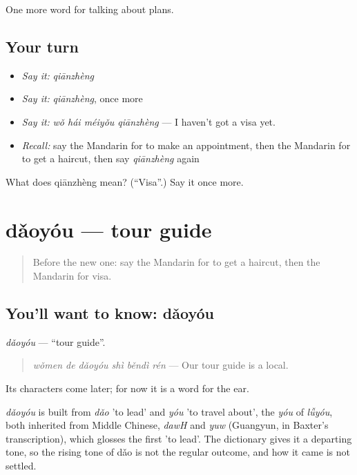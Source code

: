 \begin{grammarlens}[title={What you've built}]
One more word for talking about plans.
\end{grammarlens}

\subsection*{Your turn}
\begin{itemize}
\raggedright
  \item \emph{Say it:} \emph{qiānzhèng}
  \item \emph{Say it:} \emph{qiānzhèng}, once more
  \item \emph{Say it:} \emph{wǒ hái méiyǒu qiānzhèng} — I haven't got a visa yet.
  \item \emph{Recall:} say the Mandarin for to make an appointment, then the Mandarin for to get a haircut, then say \emph{qiānzhèng} again
\end{itemize}

\begin{tcolorbox}[breakable,colback=teal!4,colframe=teal!35!black,title={Before you move on}]
What does qiānzhèng mean? (\textquotedblleft{}Visa\textquotedblright{}.) Say it once more.
\end{tcolorbox}
\section[dǎoyóu]{dǎoyóu — tour guide}

\label{lesson:ZH-C213-daoyou}



\begin{quote}
Before the new one: say the Mandarin for to get a haircut, then the Mandarin for visa.
\end{quote}

\subsection*{You'll want to know: dǎoyóu}
\emph{dǎoyóu} — \textquotedblleft{}tour guide\textquotedblright{}.

\begin{quote}
\emph{wǒmen de dǎoyóu shì běndì rén} — Our tour guide is a local.
\end{quote}

Its characters come later; for now it is a word for the ear.

\begin{cousinweb}
\emph{dǎoyóu} is built from \emph{dǎo} 'to lead' and \emph{yóu} 'to travel about', the \emph{yóu} of \emph{lǚyóu}, both inherited from Middle Chinese, \emph{dawH} and \emph{yuw} (Guangyun, in Baxter's transcription), which glosses the first 'to lead'. The dictionary gives it a departing tone, so the rising tone of dǎo is not the regular outcome, and how it came is not settled.
\end{cousinweb}

